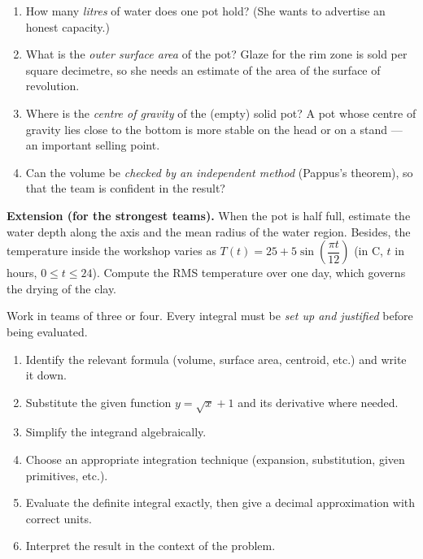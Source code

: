 \documentclass[11pt]{article}
\newcounter{popsec}
\newcounter{popsub}
\newcommand{\courssub}[1]{%
  \stepcounter{popsub}%
  \par\vspace{9pt}\noindent{\popxbold\fontsize{11.5}{13}\selectfont\color{popink}{\color{poporange}\thepopsec.\thepopsub}\hspace{6pt}#1}\par\nopagebreak\vspace{4pt}
}
\begin{document}
\begin{enumerate}
\item How many \emph{litres} of water does one pot hold? (She wants to advertise an honest capacity.)
\item What is the \emph{outer surface area} of the pot? Glaze for the rim zone is sold per square decimetre, so she needs an estimate of the area of the surface of revolution.
\item Where is the \emph{centre of gravity} of the (empty) solid pot? A pot whose centre of gravity lies close to the bottom is more stable on the head or on a stand --- an important selling point.
\item Can the volume be \emph{checked by an independent method} (Pappus's theorem), so that the team is confident in the result?
\end{enumerate}

\textbf{Extension (for the strongest teams).} When the pot is half full, estimate the water depth along the axis and the mean radius of the water region. Besides, the temperature inside the workshop varies as $T(t)=25+5\sin\!\left(\dfrac{\pi t}{12}\right)$ (in \textdegree C, $t$ in hours, $0\le t\le 24$). Compute the RMS temperature over one day, which governs the drying of the clay.

\courssub{Tasks}

Work in teams of three or four. Every integral must be \emph{set up and justified} before being evaluated.

\begin{methode}
\begin{enumerate}
\item Identify the relevant formula (volume, surface area, centroid, etc.) and write it down.
\item Substitute the given function $y=\sqrt{x}+1$ and its derivative where needed.
\item Simplify the integrand algebraically.
\item Choose an appropriate integration technique (expansion, substitution, given primitives, etc.).
\item Evaluate the definite integral exactly, then give a decimal approximation with correct units.
\item Interpret the result in the context of the problem.
\end{enumerate}
\end{methode}
\end{document}
